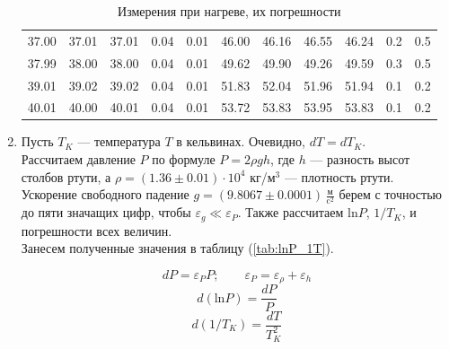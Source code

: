 \documentclass[a4paper,12pt]{article} %
\begin{document}
\begin{enumerate}
\begin{table}[h]
\begin{tabular}{|cc|c|c|c|ccc|c|c|c|}
        37.00 & 37.01 & 37.01 & 0.04 & 0.01 & 46.00 & 46.16 & 46.55 & 46.24 & 0.2 & 0.5 \\
        37.99 & 38.00 & 38.00 & 0.04 & 0.01 & 49.62 & 49.90 & 49.26 & 49.59 & 0.3 & 0.5 \\
        39.01 & 39.02 & 39.02 & 0.04 & 0.01 & 51.83 & 52.04 & 51.96 & 51.94 & 0.1 & 0.2 \\
        40.01 & 40.00 & 40.01 & 0.04 & 0.01 & 53.72 & 53.83 & 53.95 & 53.83 & 0.1 & 0.2 \\
        \hline
    \end{tabular}
    \caption{Измерения при нагреве, их погрешности}
    \label{tab:heating}
\end{table}

  \item Пусть $T_K$ — температура $T$ в кельвинах. Очевидно, $dT = dT_K$.\\ 
  Рассчитаем давление $P$ по формуле $P = 2\rho g h$, 
  где $h$ — разность высот столбов ртути, 
  а $\rho = (1.36 \pm 0.01) \cdot 10^{4}$ кг/м$^3$ — плотность ртути. 
  Ускорение свободного падение $g = (9.8067 \pm 0.0001)\, \frac{\mbox{м}}{\mbox{c}^2}$ 
  берем с точностью до пяти значащих цифр, чтобы $\varepsilon_g \ll \varepsilon_P$.
  Также рассчитаем $\mbox{ln}P$, $1/T_K$, и погрешности всех величин.\\ 
  Занесем полученные значения в таблицу (\ref{tab:lnP_1T}).

  \begin{equation}
    dP = \varepsilon_{P} P; \qquad \varepsilon_P = \varepsilon_{\rho} + \varepsilon_h
  \end{equation}
  \begin{equation}
    d(\text{ln}P) = \frac{dP}{P}
  \end{equation}
  \begin{equation}
    d(1/T_K) = \frac{dT}{T_K^2}
  \end{equation}


\end{enumerate}
\end{document}
